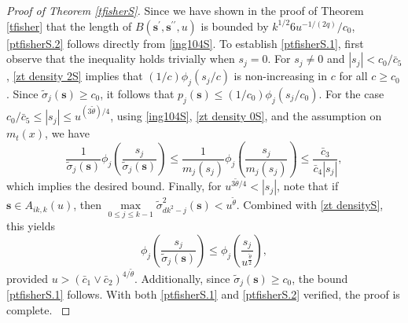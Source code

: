 \documentclass[10pt,a4paper]{amsart}
\begin{document}
\begin{proof}[Proof of Theorem \ref{tfisherS}]
{ 
 Since we have shown in the proof of 
 Theorem \ref{tfisher} that the length of $B(\mathbf{s}^{\prime},\mathbf{s}^{\prime\prime},u)$ is bounded by $k^{1/2}6u^{-1/(2q)}/c_0$,
\eqref{ptfisherS.2} follows directly from
\eqref{ing104S}.
To establish
\eqref{ptfisherS.1}, first observe that the inequality holds trivially 
when $s_j=0$.
For $s_j \neq 0$ and
$|s_j|<c_0/\bar{c}_5$, \eqref{zt density 2S} implies that $(1/c)\phi_j(s_j/c)$ is non-increasing in $c$ for all $c\geq c_0$. Since $\tilde{\sigma}_j(\mathbf{s})\geq c_0$, it follows that $p_j(\mathbf{s})\leq(1/c_0)\phi_j(s_j/c_0)$. For the case $c_0/\bar{c}_5\leq|s_j|\leq u^{(3\tilde{\theta})/4}$, using \eqref{ing104S}, \eqref{zt density 0S}, and the assumption on $m_t(x)$, we have 
\begin{equation*}\label{ptfisherS.3}
\frac{1}{\tilde{\sigma}_j(\mathbf{s})}\phi_j(\frac{s_j}{\tilde{\sigma}_j(\mathbf{s})})\leq \frac{1}{m_j(s_j)}\phi_j(\frac{s_j}{m_j(s_j)})\leq \frac{\bar{c}_3}{\bar{c}_4|s_j|},
\end{equation*}
which implies the desired bound. Finally, for $u^{3\tilde{\theta}/4}<|s_j|$, note that if $\mathbf{s}\in A_{ik,k}(u)$, then $\max\limits_{0\leq j\leq k-1}\tilde{\sigma}^2_{dk^2-j}(\mathbf{s})<u^{\tilde{\theta}}$. 
Combined with \eqref{zt densityS}, this yields
\begin{equation*}\label{ptfisherS.4}
\phi_j(\frac{s_j}{\tilde{\sigma}_j(\mathbf{s})})\leq \phi_j(\frac{s_j}{u^{\frac{\tilde{\theta}}{2}}}),
\end{equation*}
provided $u> (\bar{c}_1\vee\bar{c}_2)^{4/\tilde{\theta}}$.
Additionally, since $\tilde{\sigma}_j(\mathbf{s})\geq c_0$,
the bound
\eqref{ptfisherS.1} follows.
With both 
\eqref{ptfisherS.1} and \eqref{ptfisherS.2} verified,
the proof is complete.
}
\end{proof}
\end{document}
